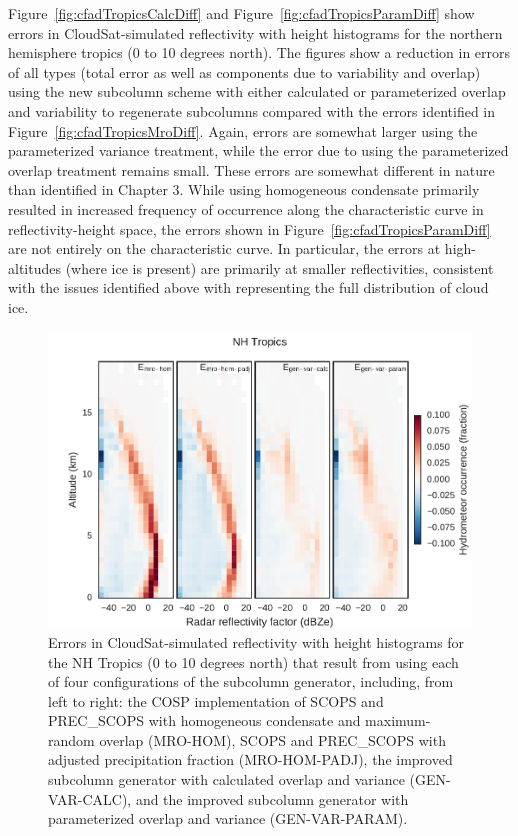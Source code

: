 Figure~\ref{fig:cfadTropicsCalcDiff} and
Figure~\ref{fig:cfadTropicsParamDiff} show errors in CloudSat-simulated
reflectivity with height histograms for the northern hemisphere tropics
(0 to 10 degrees north). The figures show a reduction in errors of all
types (total error as well as components due to variability and overlap)
using the new subcolumn scheme with either calculated or parameterized
overlap and variability to regenerate subcolumns compared with the
errors identified in Figure~\ref{fig:cfadTropicsMroDiff}. Again, errors
are somewhat larger using the parameterized variance treatment, while
the error due to using the parameterized overlap treatment remains
small. These errors are somewhat different in nature than identified in
Chapter 3. While using homogeneous condensate primarily resulted in
increased frequency of occurrence along the characteristic curve in
reflectivity-height space, the errors shown in
Figure~\ref{fig:cfadTropicsParamDiff} are not entirely on the
characteristic curve. In particular, the errors at high-altitudes (where
ice is present) are primarily at smaller reflectivities, consistent with
the issues identified above with representing the full distribution of
cloud ice.

\begin{figure}[htbp]
\centering
\includegraphics{graphics/subgrid2_cfadDbze94_NHTropics_all_diff.pdf}
\caption{\label{fig:cfadTropicsAllDiff}Errors in CloudSat-simulated
reflectivity with height histograms for the NH Tropics (0 to 10 degrees
north) that result from using each of four configurations of the
subcolumn generator, including, from left to right: the COSP
implementation of SCOPS and PREC\_SCOPS with homogeneous condensate and
maximum-random overlap (MRO-HOM), SCOPS and PREC\_SCOPS with adjusted
precipitation fraction (MRO-HOM-PADJ), the improved subcolumn generator
with calculated overlap and variance (GEN-VAR-CALC), and the improved
subcolumn generator with parameterized overlap and variance
(GEN-VAR-PARAM).}\label{fig:cfadTropicsAllDiff}
\end{figure}

